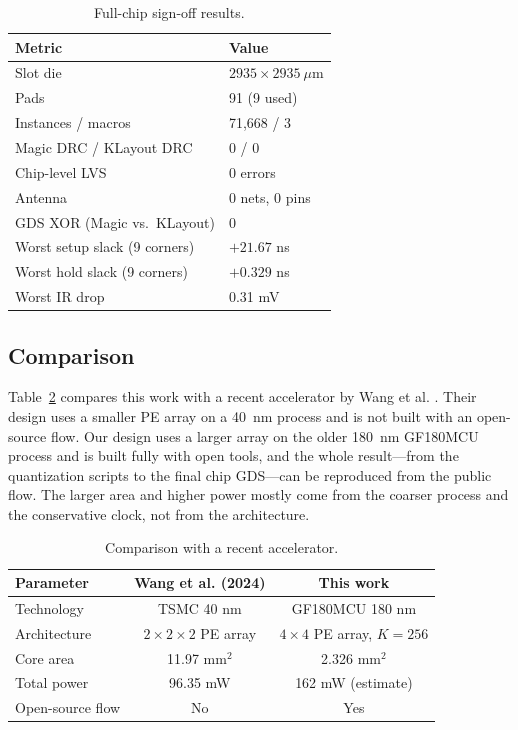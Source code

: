 \documentclass[conference,a4paper]{APSIPA2026}
\begin{document}
\begin{table}[h]
\caption{Full-chip sign-off results.}
\label{tab:chip}
\centering
\renewcommand{\arraystretch}{1.08}
\begin{tabular}{@{}ll@{}}
\toprule
Metric & Value \\
\midrule
Slot die & $2935\times2935~\mu$m \\
Pads & 91 (9 used) \\
Instances / macros & 71,668 / 3 \\
Magic DRC / KLayout DRC & 0 / 0 \\
Chip-level LVS & 0 errors \\
Antenna & 0 nets, 0 pins \\
GDS XOR (Magic vs.\ KLayout) & 0 \\
Worst setup slack (9 corners) & $+21.67$ ns \\
Worst hold slack (9 corners) & $+0.329$ ns \\
Worst IR drop & 0.31 mV \\
\bottomrule
\end{tabular}
\end{table}

\subsection{Comparison}
Table~\ref{tab:compare} compares this work with a recent accelerator by Wang et al. \cite{wang}. Their design uses a smaller PE array on a 40~nm process and is not built with an open-source flow. Our design uses a larger array on the older 180~nm GF180MCU process and is built fully with open tools, and the whole result---from the quantization scripts to the final chip GDS---can be reproduced from the public flow. The larger area and higher power mostly come from the coarser process and the conservative clock, not from the architecture.

\begin{table}[h]
\caption{Comparison with a recent accelerator.}
\label{tab:compare}
\centering
\renewcommand{\arraystretch}{1.08}
\begin{tabular}{@{}lcc@{}}
\toprule
Parameter & Wang et al. (2024) & This work \\
\midrule
Technology       & TSMC 40 nm                 & GF180MCU 180 nm \\
Architecture     & $2\times2\times2$ PE array & $4\times4$ PE array, $K{=}256$ \\
Core area        & 11.97 mm$^2$               & 2.326 mm$^2$ \\
Total power      & 96.35 mW                   & 162 mW (estimate) \\
Open-source flow & No                         & Yes \\
\bottomrule
\end{tabular}
\end{table}
\end{document}
